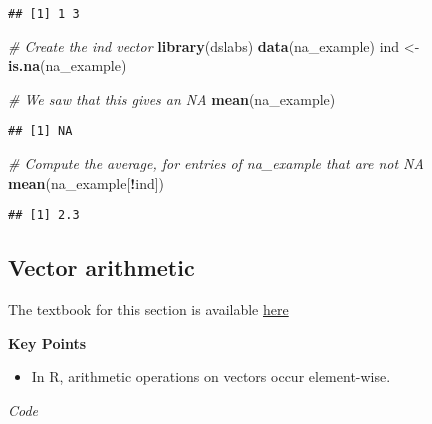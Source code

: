 \documentclass[
]{article}
\newenvironment{Shaded}{\begin{snugshade}}{\end{snugshade}}
\newcommand{\CommentTok}[1]{\textcolor[rgb]{0.56,0.35,0.01}{\textit{#1}}}
\newcommand{\KeywordTok}[1]{\textcolor[rgb]{0.13,0.29,0.53}{\textbf{#1}}}
\newcommand{\NormalTok}[1]{#1}
\newcommand{\OperatorTok}[1]{\textcolor[rgb]{0.81,0.36,0.00}{\textbf{#1}}}
\newcommand{\StringTok}[1]{\textcolor[rgb]{0.31,0.60,0.02}{#1}}
\providecommand{\tightlist}{%
  \setlength{\itemsep}{0pt}\setlength{\parskip}{0pt}}
\begin{document}
\begin{verbatim}
## [1] 1 3
\end{verbatim}

\begin{Shaded}
\begin{Highlighting}[]
\CommentTok{# Create the ind vector}
\KeywordTok{library}\NormalTok{(dslabs)}
\KeywordTok{data}\NormalTok{(na_example)}
\NormalTok{ind <-}\StringTok{ }\KeywordTok{is.na}\NormalTok{(na_example)}

\CommentTok{# We saw that this gives an NA}
\KeywordTok{mean}\NormalTok{(na_example)}
\end{Highlighting}
\end{Shaded}

\begin{verbatim}
## [1] NA
\end{verbatim}

\begin{Shaded}
\begin{Highlighting}[]
\CommentTok{# Compute the average, for entries of na_example that are not NA}
\KeywordTok{mean}\NormalTok{(na_example[}\OperatorTok{!}\NormalTok{ind])}
\end{Highlighting}
\end{Shaded}

\begin{verbatim}
## [1] 2.3
\end{verbatim}

\hypertarget{vector-arithmetic}{%
\subsection{Vector arithmetic}\label{vector-arithmetic}}

The textbook for this section is available
\href{https://rafalab.github.io/dsbook/r-basics.html\#vector-arithmetics}{here}

\textbf{Key Points}

\begin{itemize}
\tightlist
\item
  In R, arithmetic operations on vectors occur element-wise.
\end{itemize}

\emph{Code}

\begin{Shaded}
\end{Shaded}
\end{document}
